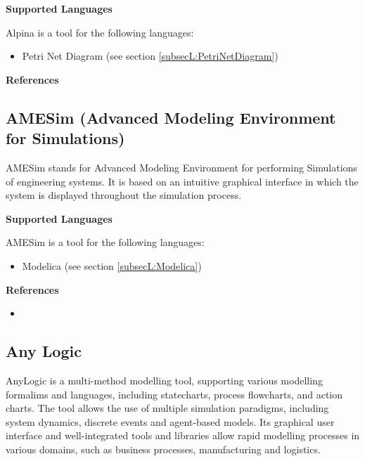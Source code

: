 \textbf{Supported Languages}

Alpina is a tool for the following languages:
\begin{itemize}
	\item Petri Net Diagram (see section \ref{subsecL:PetriNetDiagram})
\end{itemize}


\textbf{References}




\subsection{AMESim (Advanced Modeling Environment for Simulations)}
\label{subsecT:AMESim}


AMESim stands for Advanced Modeling Environment for performing Simulations of engineering systems. It is based on an intuitive graphical interface in which the system is displayed throughout the simulation process.

\textbf{Supported Languages}

AMESim is a tool for the following languages:
\begin{itemize}
	\item Modelica (see section \ref{subsecL:Modelica})
\end{itemize}


\textbf{References}
\begin{itemize}
	
\item {}
\end{itemize}



\subsection{Any Logic}
\label{subsecT:AnyLogic}


AnyLogic is a multi-method modelling tool, supporting various modelling formalims and languages, including statecharts, process flowcharts, and action charts. The tool allows the use of multiple simulation paradigms, including system dynamics, discrete events and agent-based models. Its graphical user interface and well-integrated tools and libraries allow rapid modelling processes in various domains, such as business processes, manufacturing and logistics.

